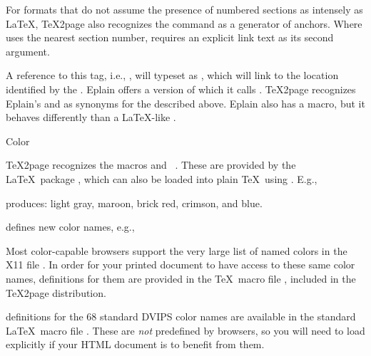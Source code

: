 For formats that do not assume the presence of numbered
sections as intensely as \LaTeX, \TeX2page also recognizes the \p{\xrtag}
command as a generator of anchors.  Where \p{\label}
uses the nearest section number, \p{\xrtag} requires
an explicit link text as its second argument.


\n A reference to this tag, i.e.,
\p{\ref{|meta[alabel]}}, will typeset as
, which will link to the location
identified by the \p{\xrtag}.\f{%
%
Eplain offers a version of \p{\xrtag} which it calls
.  \TeX2page recognizes Eplain’s  and
\p{\xrefn} as synonyms for the \p{\ref} described
above.  Eplain also has a \p{\ref} macro, but it
behaves differently than a \LaTeX-like \p{\ref}.}

\beginsection Color

\TeX2page recognizes the macros \p{\color} and
\p{\definecolor}~\cite{latex-graphicx}.  These are provided by the \LaTeX\
package , which can also be loaded into
plain \TeX\ using .  E.g.,


\n produces:
{\color[gray]{.75} light gray},
{\color[rgb]{.69, .19, .38} maroon},
{\color[cmyk]{0, .89, .94, .28} brick red},
{\color[RGB]{220, 20, 60} crimson},
and {\color{blue} blue}.

\p{\definecolor} defines new color names, e.g.,


Most color-capable browsers support the very large list
of named colors in the X11 file .  In order
for your printed document to have access to these same
color names, definitions for them are provided in the
\TeX\ macro file , included in the \TeX2page
distribution.


 definitions for the 68 standard DVIPS
color names are available in the standard \LaTeX\ macro
file .  These are {\em not} predefined
by browsers, so you will need to load \p{dvipsnam.def}
explicitly if your HTML document is to benefit from
them.

